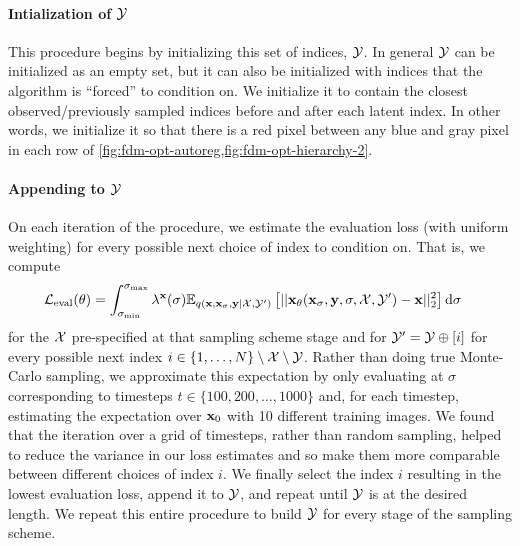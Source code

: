 \paragraph{Intialization of $\mathcal{Y}$}
This procedure begins by initializing this set of indices, $\mathcal{Y}$. In general $\mathcal{Y}$ can be initialized as an empty set, but it can also be initialized with indices that the algorithm is ``forced'' to condition on. We initialize it to contain the closest observed/previously sampled indices before and after each latent index. In other words, we initialize it so that there is a red pixel between any blue and gray pixel in each row of \cref{fig:fdm-opt-autoreg,fig:fdm-opt-hierarchy-2}.

\paragraph{Appending to $\mathcal{Y}$}
On each iteration of the procedure, we estimate the evaluation loss (with uniform weighting) for every possible next choice of index to condition on. That is, we compute
\begin{align}
    \mathcal{L}_\text{eval}(\theta) &= \int_{\sigma_\text{min}}^{\sigma_\text{max}} \lambda^{\mathbf{x}}(\sigma) \mathbb{E}_{q({\mathbf{x}}, {\mathbf{x}}_\sigma, {\mathbf{y}}|{\mathcal{X}}, {\mathcal{Y}}')} \left[ 
    || {\mathbf{x}}_\theta({\mathbf{x}}_\sigma, {\mathbf{y}}, \sigma, {\mathcal{X}}, {\mathcal{Y}}') - {\mathbf{x}} ||_2^2 \right] \mathrm{d}\sigma
\end{align}
for the ${\mathcal{X}}$ pre-specified at that sampling scheme stage and for ${\mathcal{Y}}' = {\mathcal{Y}} \oplus [i]$ for every possible next index ${i\in\{1,\ldots,N\}\setminus\mathcal{X}\setminus\mathcal{Y}}$.
Rather than doing true Monte-Carlo sampling, we approximate this expectation by only evaluating at $\sigma$ corresponding to timesteps ${t \in \{100,200,\ldots,1000\}}$ and, for each timestep, estimating the expectation over ${\mathbf{x}}_0$ with 10 different training images. We found that the iteration over a grid of timesteps, rather than random sampling, helped to reduce the variance in our loss estimates and so make them more comparable between different choices of index $i$. We finally select the index $i$ resulting in the lowest evaluation loss, append it to $\mathcal{Y}$, and repeat until $\mathcal{Y}$ is at the desired length. We repeat this entire procedure to build ${\mathcal{Y}}$ for every stage of the sampling scheme.


